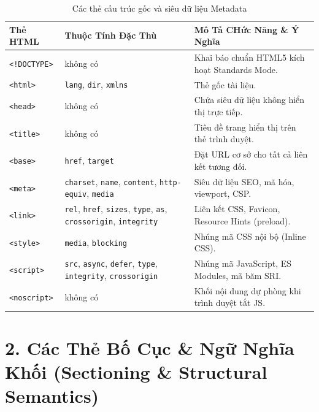 \documentclass[11pt,oneside]{book}
\newcommand{\codeinline}[1]{\textcolor{accentOrange}{\texttt{#1}}}
\begin{document}
\begin{table}[H]
\centering
\begin{prettyTableBox}
\small
{}
\begin{tabularx}{\linewidth}{lp{3.5cm}X}
\rowcolor{primaryBlue}
\color{white}\textbf{Thẻ HTML} & \color{white}\textbf{Thuộc Tính Đặc Thù} & \color{white}\textbf{Mô Tả CHức Năng \& Ý Nghĩa} \\
\hline
\codeinline{<!DOCTYPE>} & không có & Khai báo chuẩn HTML5 kích hoạt Standards Mode. \\
\codeinline{<html>} & \codeinline{lang}, \codeinline{dir}, \codeinline{xmlns} & Thẻ gốc tài liệu. \\
\codeinline{<head>} & không có & Chứa siêu dữ liệu không hiển thị trực tiếp. \\
\codeinline{<title>} & không có & Tiêu đề trang hiển thị trên thẻ trình duyệt. \\
\codeinline{<base>} & \codeinline{href}, \codeinline{target} & Đặt URL cơ sở cho tất cả liên kết tương đối. \\
\codeinline{<meta>} & \codeinline{charset}, \codeinline{name}, \codeinline{content}, \codeinline{http-equiv}, \codeinline{media} & Siêu dữ liệu SEO, mã hóa, viewport, CSP. \\
\codeinline{<link>} & \codeinline{rel}, \codeinline{href}, \codeinline{sizes}, \codeinline{type}, \codeinline{as}, \codeinline{crossorigin}, \codeinline{integrity} & Liên kết CSS, Favicon, Resource Hints (preload). \\
\codeinline{<style>} & \codeinline{media}, \codeinline{blocking} & Nhúng mã CSS nội bộ (Inline CSS). \\
\codeinline{<script>} & \codeinline{src}, \codeinline{async}, \codeinline{defer}, \codeinline{type}, \codeinline{integrity}, \codeinline{crossorigin} & Nhúng mã JavaScript, ES Modules, mã băm SRI. \\
\codeinline{<noscript>} & không có & Khối nội dung dự phòng khi trình duyệt tắt JS. \\
\end{tabularx}
\end{prettyTableBox}
\vspace{-2pt}
\caption{Các thẻ cấu trúc gốc và siêu dữ liệu Metadata}
\end{table}

\section{2. Các Thẻ Bố Cục \& Ngữ Nghĩa Khối (Sectioning \& Structural Semantics)}
\end{document}
